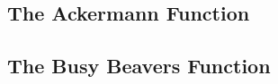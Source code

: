\subsection{The Ackermann Function}

\subsection{The Busy Beavers Function}







\begin{comment}

-Is googology part of discrete math, too? It's about fast growing functions that typically take
 natural arguments.
 
-What can we actually compute in googology? Maybe initial, final or general finite sections of the
 string of digits? In some video, it was mentioned that it is known that Graham's number is known to
 end in 7. How can such a thing be proven?
 
-If you want to play the game "who can name the biggest number", it's obviously always the person
 who answers last - one can just use the biggest number so far and add 1 - or multiply by 2 - or 
 take the factorial of it - or whatever.

-What's the point of it all? Is it just an intellectual game? Or can it tell us something about the
 limits of mathematics?


https://en.wikipedia.org/wiki/Ackermann_function
https://en.wikipedia.org/wiki/Large_numbers
https://en.wikipedia.org/wiki/Fast-growing_hierarchy

How Big Is Graham’s Number? (S1EP04)
https://www.youtube.com/watch?v=Tw5AaS0qNgs

The Maths Behind Big Numbers (S1EP03)
https://www.youtube.com/watch?v=tWh6wRM87sc

The Boundary of Computation
https://www.youtube.com/watch?v=kmAc1nDizu0
-But I think, the non-computability of BB(n) has not so much to do with it's size but with the
 halting problem. In priciple, it may be possible to come up with small non-computable
 numbers, I think. How about BB(n)/BB(n+1) - it should be close to zero even for moderately
 large n - but it's a rational number, so I'm not sure, if that counts. Maybe define a number
 BB*(n) as follows: Let a BB-machine print not only 0s and 1s on a tape but rather numbers
 from a given range - say 0..9 - acroding to some rule (like step-number mod 10). The output is
 not how many numbers it has printed but the last printed number. It's just as non-computable as
 the regular BB-number - but it's clearly in the range 0..9



\end{comment}
